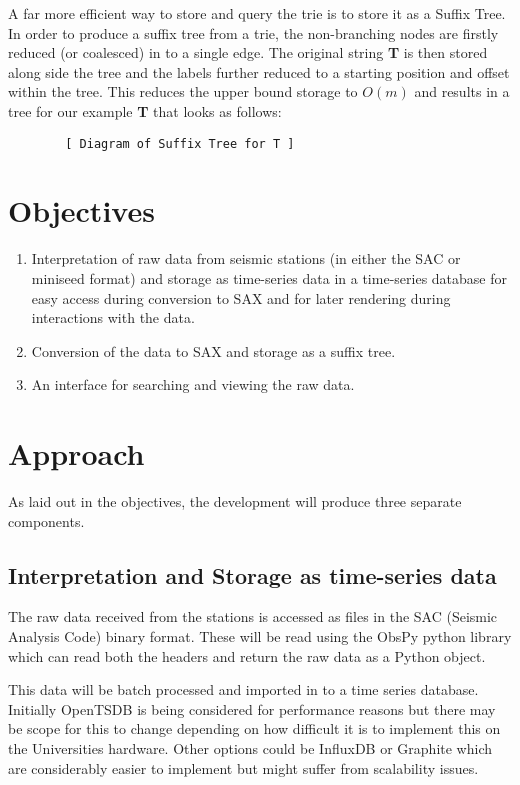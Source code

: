 \documentclass[11pt]{scrartcl}
\begin{document}
	A far more efficient way to store and query the trie is to store it as a Suffix Tree.  In order to produce a suffix tree from a trie, the non-branching nodes are firstly reduced (or coalesced) in to a single edge.  The original string \textbf{T} is then stored along side the tree and the labels further reduced to a starting position and offset within the tree.  This reduces the upper bound storage to \textit{$O(m)$} and results in a tree for our example \textbf{T} that looks as follows:
	\begin{verbatim}
		[ Diagram of Suffix Tree for T ]
	\end{verbatim}
	

\section{Objectives}
\begin{enumerate}
	\item Interpretation of raw data from seismic stations (in either the SAC or miniseed format) and storage as time-series data in a time-series database for easy access during conversion to SAX and for later rendering during interactions with the data.
	\item Conversion of the data to SAX and storage as a suffix tree.
	\item An interface for searching and viewing the raw data.
\end{enumerate}

\section{Approach}
	As laid out in the objectives, the development will produce three separate components.
	
\subsection{Interpretation and Storage as time-series data}
	The raw data received from the stations is accessed as files in the SAC (Seismic Analysis Code) binary format.  These will be read using the ObsPy python library which can read both the headers and return the raw data as a Python object.
	
	This data will be batch processed and imported in to a time series database.  Initially OpenTSDB is being considered for performance reasons but there may be scope for this to change depending on how difficult it is to implement this on the Universities hardware.  Other options could be InfluxDB or Graphite which are considerably easier to implement but might suffer from scalability issues.
\end{document}
